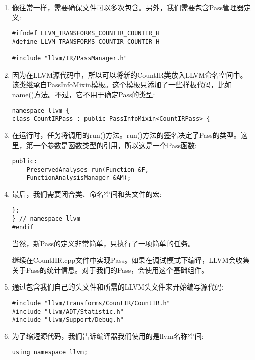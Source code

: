 \begin{enumerate}
\item 像往常一样，需要确保文件可以多次包含。另外，我们需要包含Pass管理器定义:
\begin{lstlisting}[caption={}]
#ifndef LLVM_TRANSFORMS_COUNTIR_COUNTIR_H
#define LLVM_TRANSFORMS_COUNTIR_COUNTIR_H

#include "llvm/IR/PassManager.h"
\end{lstlisting}
	
\item 因为在LLVM源代码中，所以可以将新的CountIR类放入LLVM命名空间中。该类继承自PassInfoMixin模板。这个模板只添加了一些样板代码，比如name()方法。不过，它不用于确定Pass的类型:
\begin{lstlisting}[caption={}]
namespace llvm {
class CountIRPass : public PassInfoMixin<CountIRPass> {
\end{lstlisting}
			
\item 在运行时，任务将调用的run()方法。run()方法的签名决定了Pass的类型。这里，第一个参数是函数类型的引用，所以这是一个Pass函数:
\begin{lstlisting}[caption={}]
public:
	PreservedAnalyses run(Function &F,
	FunctionAnalysisManager &AM);
\end{lstlisting}
			
\item 最后，我们需要闭合类、命名空间和头文件的宏:
\begin{lstlisting}[caption={}]
};
} // namespace llvm
#endif
\end{lstlisting}
当然，新Pass的定义非常简单，只执行了一项简单的任务。\par

继续在CountIIR.cpp文件中实现Pass。如果在调试模式下编译，LLVM会收集关于Pass的统计信息。对于我们的Pass，会使用这个基础组件。\par
	
\item 通过包含我们自己的头文件和所需的LLVM头文件来开始编写源代码:
\begin{lstlisting}[caption={}]
#include "llvm/Transforms/CountIR/CountIR.h"
#include "llvm/ADT/Statistic.h"
#include "llvm/Support/Debug.h"
\end{lstlisting}
	
\item 为了缩短源代码，我们告诉编译器我们使用的是llvm名称空间:
\begin{lstlisting}[caption={}]
using namespace llvm;
\end{lstlisting}
	

\end{enumerate}
